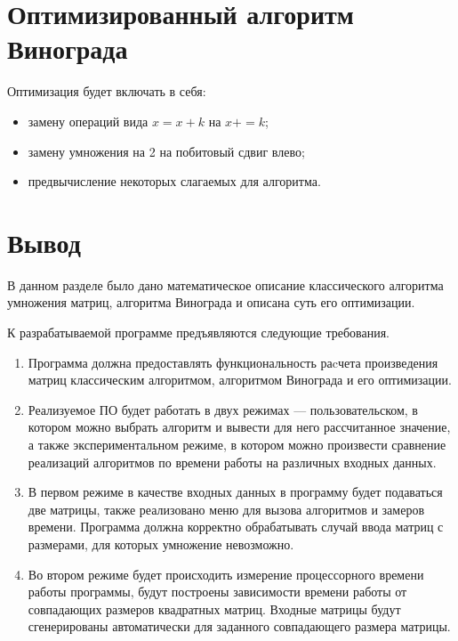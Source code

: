 \section{Оптимизированный алгоритм Винограда}

Оптимизация будет включать в себя:
\begin{itemize}[label=---]
	\item замену операций вида $x = x + k$ на $x += k$;
	\item замену умножения на 2 на побитовый сдвиг влево;
	\item предвычисление некоторых слагаемых для алгоритма.
\end{itemize}

\section{Вывод}

В данном разделе было дано математическое описание классического алгоритма умножения матриц, алгоритма Винограда и описана суть его оптимизации.

К разрабатываемой программе предъявляются следующие требования.

\begin{enumerate}
	\item Программа должна предоставлять функциональность раcчета произведения матриц классическим алгоритмом, алгоритмом Винограда и его оптимизации.
	
	\item Реализуемое ПО будет работать в двух режимах --- пользовательском, в котором можно выбрать алгоритм и вывести для него рассчитанное значение, а также экспериментальном режиме, в котором можно произвести сравнение реализаций алгоритмов по времени работы на различных входных данных.
	
	\item В первом режиме в качестве входных данных в программу будет подаваться две матрицы, также реализовано меню для вызова алгоритмов и замеров времени. Программа должна корректно обрабатывать случай ввода матриц с размерами, для которых умножение невозможно.
	
	\item Во втором режиме будет происходить измерение процессорного времени работы программы, будут построены зависимости времени работы от совпадающих размеров квадратных матриц. Входные матрицы будут сгенерированы автоматически для заданного совпадающего размера матрицы.
\end{enumerate}